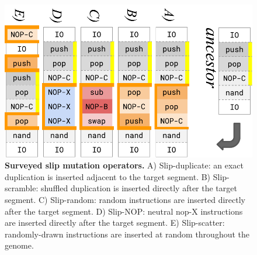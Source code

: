 \begin{figure}[!ht]
  \centering
  \includegraphics[height=0.6\linewidth, angle=90]{imgs/GeneDupeOps.pdf}
    \caption{
    \textbf{Surveyed slip mutation operators.}
    A) Slip-duplicate: an exact duplication is inserted adjacent to the target segment.
    B) Slip-scramble: shuffled duplication is inserted directly after the target segment.
    C) Slip-random: random instructions are inserted directly after the target segment.
    D) Slip-NOP: neutral nop-X instructions are inserted directly after the target segment.
    E) Slip-scatter: randomly-drawn instructions are inserted at random throughout the genome.
    }
    \label{fig:slip_mut_variants}
\end{figure}
